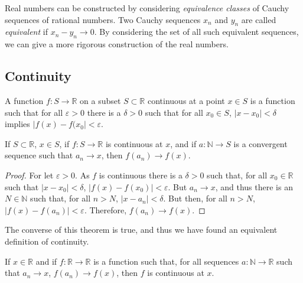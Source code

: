 \documentclass[crop=false,class=book,oneside]{standalone}
\begin{document}
            Real numbers can be constructed by considering
            \textit{equivalence classes} of Cauchy sequences of
            rational numbers. Two Cauchy sequences $x_{n}$ and
            $y_{n}$ are called \textit{equivalent} if
            $x_{n}-y_{n}\rightarrow{0}$. By considering the set
            of all such equivalent sequences, we can give a more
            rigorous construction of the real numbers.
        \subsection{Continuity}
            \begin{definition}
                A function $f:S\rightarrow\mathbb{R}$
                on a subset $S\subset\mathbb{R}$ continuous
                at a point $x\in{S}$ is a function such that
                for all $\varepsilon>0$ there is a $\delta>0$
                such that for all $x_{0}\in{S}$,
                $|x-x_{0}|<\delta$ implies
                $|f(x)-f(x_{0}|<\varepsilon$.
            \end{definition}
            \begin{theorem}
                If $S\subset\mathbb{R}$, $x\in{S}$,
                if $f:S\rightarrow\mathbb{R}$
                is continuous at $x$, and if
                $a:\mathbb{N}\rightarrow{S}$
                is a convergent sequence such that
                $a_{n}\rightarrow{x}$, then
                $f(a_{n})\rightarrow{f(x)}$.
            \end{theorem}
            \begin{proof}
                For let $\varepsilon>0$. As $f$ is
                continuous there is a $\delta>0$ such that,
                for all $x_{0}\in\mathbb{R}$
                such that $|x-x_{0}|<\delta$,
                $|f(x)-f(x_{0})|<\varepsilon$.
                But $a_{n}\rightarrow{x}$, and thus there is an
                $N\in\mathbb{N}$ such that, for all $n>N$,
                $|x-a_{n}|<\delta$. But then, for all $n>N$,
                $|f(x)-f(a_{n})|<\varepsilon$. Therefore,
                $f(a_{n})\rightarrow{f(x)}$.
            \end{proof}
            The converse of this theorem is true,
            and thus we have
            found an equivalent definition of continuity.
            \begin{theorem}
                If $x\in\mathbb{R}$ and if
                $f:\mathbb{R}\rightarrow\mathbb{R}$
                is a function such that, for all sequences
                $a:\mathbb{N}\rightarrow\mathbb{R}$ such that
                $a_{n}\rightarrow{x}$,
                $f(a_{n})\rightarrow{f(x)}$,
                then $f$ is continuous at $x$.
            \end{theorem}
\end{document}
